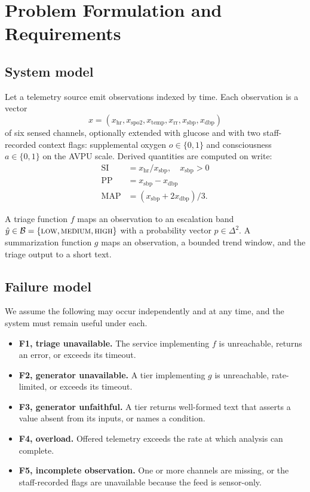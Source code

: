 \documentclass[lettersize,journal]{IEEEtran}
\begin{document}
\section{Problem Formulation and Requirements}
\label{sec:problem}

\subsection{System model}

Let a telemetry source emit observations indexed by time. Each observation is a
vector
\begin{equation}
x = (x_{\mathrm{hr}}, x_{\mathrm{spo2}}, x_{\mathrm{temp}},
     x_{\mathrm{rr}}, x_{\mathrm{sbp}}, x_{\mathrm{dbp}})
\end{equation}
of six sensed channels, optionally extended with glucose and with two
staff-recorded context flags: supplemental oxygen $o \in \{0,1\}$ and
consciousness $a \in \{0,1\}$ on the AVPU scale. Derived quantities are computed
on write:
\begin{align}
\mathrm{SI}  &= x_{\mathrm{hr}} / x_{\mathrm{sbp}}, \quad x_{\mathrm{sbp}} > 0 \\
\mathrm{PP}  &= x_{\mathrm{sbp}} - x_{\mathrm{dbp}} \\
\mathrm{MAP} &= (x_{\mathrm{sbp}} + 2 x_{\mathrm{dbp}}) / 3 .
\end{align}

A triage function $f$ maps an observation to an escalation band
$\hat{y} \in \mathcal{B} = \{\textsc{low}, \textsc{medium}, \textsc{high}\}$
with a probability vector $p \in \Delta^{2}$. A summarization function $g$ maps
an observation, a bounded trend window, and the triage output to a short text.

\subsection{Failure model}

We assume the following may occur independently and at any time, and the system
must remain useful under each.

\begin{itemize}
  \item \textbf{F1, triage unavailable.} The service implementing $f$ is
        unreachable, returns an error, or exceeds its timeout.
  \item \textbf{F2, generator unavailable.} A tier implementing $g$ is
        unreachable, rate-limited, or exceeds its timeout.
  \item \textbf{F3, generator unfaithful.} A tier returns well-formed text that
        asserts a value absent from its inputs, or names a condition.
  \item \textbf{F4, overload.} Offered telemetry exceeds the rate at which
        analysis can complete.
  \item \textbf{F5, incomplete observation.} One or more channels are missing,
        or the staff-recorded flags are unavailable because the feed is
        sensor-only.
\end{itemize}
\end{document}
